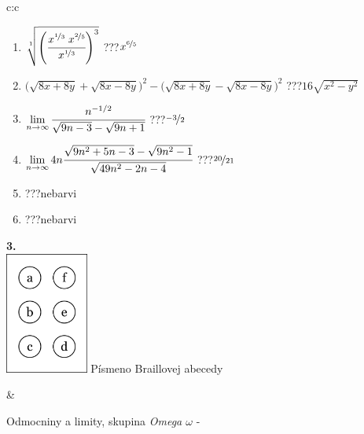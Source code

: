 \documentclass[10pt]{report}
\begin{document}
\begin{tabular}{c:c}
\begin{minipage}[c][104.5mm][t]{0.5\linewidth}
\begin{center}
\begin{minipage}{0.79\linewidth}
\begin{center}
\begin{varwidth}{\linewidth}
\begin{enumerate}
\small
\item $\sqrt[1]{\left(\cfrac{x^{\nicefrac{1}{3}}\;x^{\nicefrac{2}{5}}}{x^{\nicefrac{1}{3}}}\right)^{3}}$\quad \dotfill\; ???\;\dotfill \quad $x^{\nicefrac{6}{5}}$
\item {\footnotesize{\scriptsize$\big(\sqrt{8x+8y}+\sqrt{8x-8y}\big)^2-\big(\sqrt{8x+8y}-\sqrt{8x-8y}\big)^2$}\quad \dotfill\; ???\;\dotfill \quad $16\sqrt{x^2-y^2}$}
\item $\lim\limits_{n\to\infty}\cfrac{n^{-1/2}}{\sqrt{9n-3}-\sqrt{9n+1}}$\quad \dotfill\; ???\;\dotfill \quad $\nicefrac{-3}{2}$
\item $\lim\limits_{n\to\infty}4n\cfrac{\sqrt{9n^2+5n-3}-\sqrt{9n^2-1}}{\sqrt{49n^2-2n-4}}$\quad \dotfill\; ???\;\dotfill \quad $\nicefrac{20}{21}$
\item \quad \dotfill\; ???\;\dotfill \quad nebarvi
\item \quad \dotfill\; ???\;\dotfill \quad nebarvi
\end{enumerate}
\end{varwidth}
\end{center}
\end{minipage}
\begin{minipage}{0.20\linewidth}
\begin{center}
{\Huge\bfseries 3.} \\[2mm]
\includegraphics[height=40mm]{../images/braille.png}
{\small Písmeno Braillovej abecedy}
\end{center}
\end{minipage}
\end{center}
\end{minipage}
&
\begin{minipage}[c][104.5mm][t]{0.5\linewidth}
\begin{center}
\vspace{7mm}
{\huge Odmocniny a limity, skupina \textit{Omega $\omega$} -}\\[5mm]

\end{center}
\end{minipage}
\end{tabular}
\end{document}
